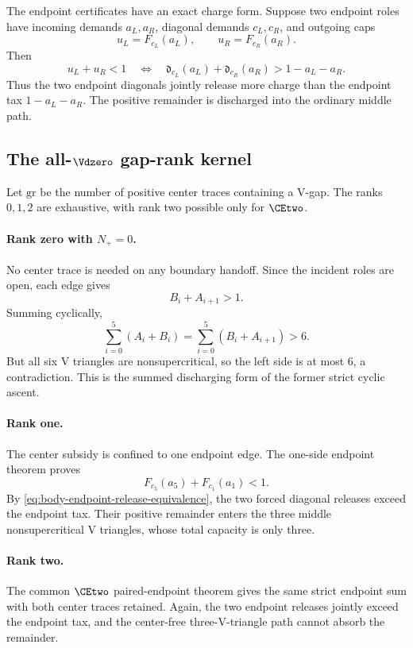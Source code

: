 The endpoint certificates have an exact charge form.  Suppose two endpoint
roles have incoming demands \(a_L,a_R\), diagonal demands \(c_L,c_R\), and
outgoing caps
\[
 u_L=F_{c_L}(a_L),
 \qquad
 u_R=F_{c_R}(a_R).
\]
Then
\begin{equation}
 u_L+u_R<1
 \quad\Longleftrightarrow\quad
 \mathfrak d_{c_L}(a_L)+\mathfrak d_{c_R}(a_R)
 >1-a_L-a_R.
 \label{eq:body-endpoint-release-equivalence}
\end{equation}
Thus the two endpoint diagonals jointly release more charge than the endpoint
tax \(1-a_L-a_R\).  The positive remainder is discharged into the ordinary
middle path.

\subsection{The all-\(\Vdzero\) gap-rank kernel}

Let \(\mathrm{gr}\) be the number of positive center traces containing a
V-gap.  The ranks \(0,1,2\) are exhaustive, with rank two possible only for
\(\CEtwo\).

\paragraph{Rank zero with \(N_+=0\).}
No center trace is needed on any boundary handoff.  Since the incident roles
are open, each edge gives
\[
 B_i+A_{i+1}>1.
\]
Summing cyclically,
\[
 \sum_{i=0}^5(A_i+B_i)
 =\sum_{i=0}^5(B_i+A_{i+1})>6.
\]
But all six V triangles are nonsupercritical, so the left side is at most
\(6\), a contradiction.  This is the summed discharging form of the former
strict cyclic ascent.

\paragraph{Rank one.}
The center subsidy is confined to one endpoint edge.  The one-side endpoint
theorem proves
\[
 F_{c_5}(a_5)+F_{c_1}(a_1)<1.
\]
By \eqref{eq:body-endpoint-release-equivalence}, the two forced diagonal
releases exceed the endpoint tax.  Their positive remainder enters the three
middle nonsupercritical V triangles, whose total capacity is only three.

\paragraph{Rank two.}
The common \(\CEtwo\) paired-endpoint theorem gives the same strict endpoint
sum with both center traces retained.  Again, the two endpoint releases
jointly exceed the endpoint tax, and the center-free three-V-triangle path
cannot absorb the remainder.

